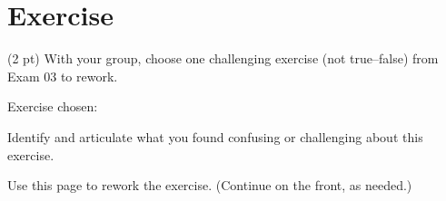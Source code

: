 %
%
%
%

\section{Exercise}

(2 pt) With your group, choose one challenging exercise (not true--false) from Exam 03 to rework.

\vspace{0.25in}

\noindent{}Exercise chosen:

\vspace{0.25in}

\noindent{}Identify and articulate what you found confusing or challenging about this exercise.

\vspace{1in}

\noindent{}Use this page to rework the exercise. (Continue on the front, as needed.)